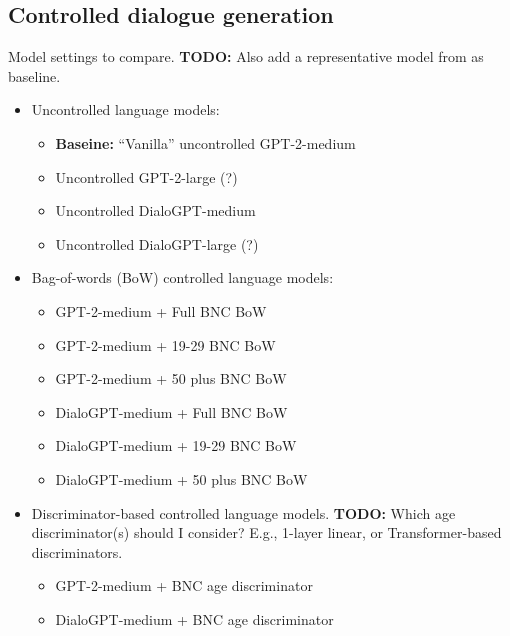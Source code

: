 \subsection{Controlled dialogue generation}

Model settings to compare. \textbf{TODO:} Also add a representative model from \cite{dathathri2019plug} as baseline.
\begin{itemize}
    \item Uncontrolled language models:
        \begin{itemize}
            \item \textbf{Baseine: }``Vanilla'' uncontrolled GPT-2-medium
            \item Uncontrolled GPT-2-large (?)
            \item Uncontrolled DialoGPT-medium
            \item Uncontrolled DialoGPT-large (?)
        \end{itemize}
    \item Bag-of-words (BoW) controlled language models:
        \begin{itemize}
            \item GPT-2-medium + Full BNC BoW
            \item GPT-2-medium + 19-29 BNC BoW
            \item GPT-2-medium + 50 plus BNC BoW
            \item DialoGPT-medium + Full BNC BoW
            \item DialoGPT-medium + 19-29 BNC BoW
            \item DialoGPT-medium + 50 plus BNC BoW
        \end{itemize}
    \item Discriminator-based controlled language models. \textbf{TODO:} Which age discriminator(s) should I consider? E.g., 1-layer linear, or Transformer-based discriminators.
        \begin{itemize}
            \item GPT-2-medium + BNC age discriminator
            \item DialoGPT-medium + BNC age discriminator
        \end{itemize}
\end{itemize}